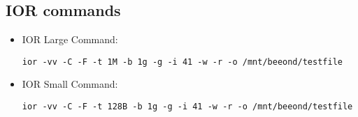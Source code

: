 \documentclass[conference]{IEEEtran}
\begin{document}
\begin{appendices}
  \section{IOR commands}

\begin{itemize}
\item IOR Large Command: {\raggedright \tt ior -vv -C -F -t 1M -b 1g -g -i 41 -w -r -o /mnt/beeond/testfile}
\item IOR Small Command: {\raggedright \tt ior -vv -C -F -t 128B -b 1g -g -i 41 -w -r -o /mnt/beeond/testfile}
\end{itemize}

\end{appendices}
\end{document}
